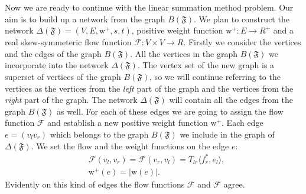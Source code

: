 \documentclass[12pt]{article}
\newcommand\inner[2]{\langle #1, #2 \rangle}
\theoremstyle{definition}
\newcommand{\fsys}{\mathfrak{F}}
\newcommand{\wt}{\mathrm{w}}
\newcommand{\wtp}{\mathrm{w}^{+}}
\newcommand{\flow}{\mathcal{F}}
\newcommand{\flowsgn}{\flow}
\newcommand{\net}{\Delta}
\numberwithin{remark}{section}
\numberwithin{theorem}{section}
\numberwithin{prop}{section}
\numberwithin{equation}{section}
\numberwithin{lemma}{section}
\numberwithin{prop_under_lemma}{lemma}
\begin{document}
    Now we are ready to continue with the linear summation method problem.
    Our aim is to build up a network from the graph $B(\fsys)$.
    We plan to construct the network $\net(\fsys) = (V, E, \wtp, s, t)$,
    positive weight function $\wtp: E \to R^{+}$ and a real skew-symmeteric flow function $\flow: V \times V \to R$.
    Firstly we consider the vertices and the edges of the graph $B(\fsys)$.
    All the vertices in the graph $B(\fsys)$ we incorporate into the network $\net(\fsys)$.
    The vertex set of the new graph is a superset of vertices of the graph $B(\fsys)$,
    so we will continue referring to the vertices as the vertices from 
    the \textit{left} part of the graph and the vertices from the \textit{right} part of the graph.
    The network $\net(\fsys)$ will contain all the edges from the graph $B(\fsys)$ as well.
    For each of these edges we are going to assign the flow function $\flow$ and
    establish a new positive weight function $\wtp$.
    Each edge $e = (v_l v_r)$ which belongs to the graph $B(\fsys)$ we include in the graph of $\net(\fsys)$.
    We set the flow and the weight functions on the edge $e$:
    \begin{align*}
      &\flow(v_l, v_r) = \flowsgn(v_r, v_l) = T_{lr} \inner{f^*_r}{e_l},\\
      &\wtp(e) = \left| \wt(e) \right|.
    \end{align*}
    Evidently on this kind of edges the flow functions $\flowsgn$ and $\flow$ agree.
    
\end{document}
